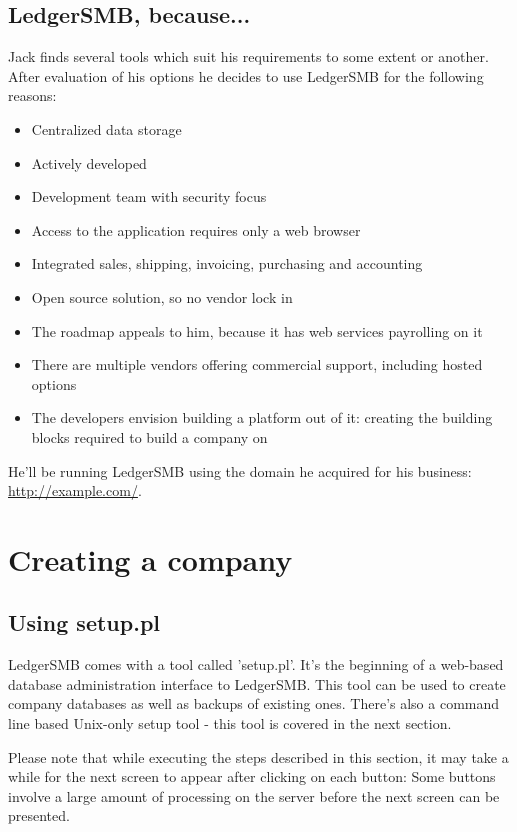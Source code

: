 \section{LedgerSMB, because...}

Jack finds several tools which suit his requirements to some extent or another.
After evaluation of his options he decides to use LedgerSMB for the following reasons:

\begin{itemize}
\item Centralized data storage
\item Actively developed
\item Development team with security focus
\item Access to the application requires only a web browser
\item Integrated sales, shipping, invoicing, purchasing and accounting
\item Open source solution, so no vendor lock in
\item The roadmap appeals to him, because it has web services payrolling on it
\item There are multiple vendors offering commercial support, including hosted options
\item The developers envision building a platform out of it: creating the building blocks
required to build a company on
\end{itemize}

He'll be running LedgerSMB using the domain he acquired for his business:
\url{http://example.com/}.

\chapter{Creating a company}
\label{cha:CompanyCreation}

\section{Using setup.pl}

LedgerSMB comes with a tool called 'setup.pl'. It's the beginning of a web-based
database administration interface to LedgerSMB. This tool can be used to create
company databases as well as backups of existing ones. There's also a command line based
Unix-only setup tool - this tool is covered in the next section.

Please note that while executing the steps described in this section, it may take a while
for the next screen to appear after clicking on each button: Some buttons involve
a large amount of processing on the server before the next screen can be presented.

